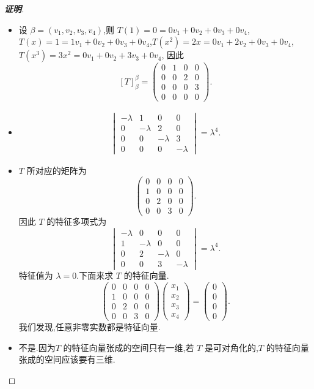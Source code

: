 ﻿\documentclass[a4paper]{article}
\begin{document}
\begin{proof}[\textbf{证明}]
  \begin{itemize}
  \item 设 $\beta=(v_1,v_2,v_{3},v_4)$,则
    $T(1)=0=0v_1+0v_2+0v_3+0v_4$,$T(x)=1=1v_1+0v_2+0v_3+0v_4$,$T(x^2)=2x=0v_1+2v_2+0v_3+0v_4$,$T(x^3)=3x^2=0v_1+0v_2+3v_3+0v_4$,
    因此
$$
[T]_{\beta}^{\beta}=
\begin{pmatrix}
  0&1&0&0\\
0&0&2&0\\
0&0&0&3\\
0&0&0&0
\end{pmatrix}.
$$
\item 
  \begin{align*}
    \begin{vmatrix}
      -\lambda&1&0&0\\
0&-\lambda&2&0\\
0&0&-\lambda&3\\
0&0&0&-\lambda
    \end{vmatrix}=\lambda^4.
  \end{align*}
\item $T$ 所对应的矩阵为
$$
\begin{pmatrix}
0&0&0&0\\
1&0&0&0\\
0&2&0&0\\
0&0&3&0
\end{pmatrix}.
$$
因此 $T$ 的特征多项式为
$$
\begin{vmatrix}
  -\lambda&0&0&0\\
1&-\lambda&0&0\\
0&2&-\lambda&0\\
0&0&3&-\lambda
\end{vmatrix}=\lambda^4.
$$
特征值为 $\lambda=0$.下面来求 $T$ 的特征向量.
$$
\begin{pmatrix}
0&0&0&0\\
1&0&0&0\\
0&2&0&0\\
0&0&3&0
\end{pmatrix}
\begin{pmatrix}
  x_1\\
x_2\\
x_3\\
x_4
\end{pmatrix}=
\begin{pmatrix}
  0\\
0\\
0\\
0
\end{pmatrix}.
$$
我们发现,任意非零实数都是特征向量.
\item 不是.因为$T$ 的特征向量张成的空间只有一维,若 $T$ 是可对角化的,$T$
  的特征向量张成的空间应该要有三维.
  \end{itemize}
\end{proof}
\end{document}
